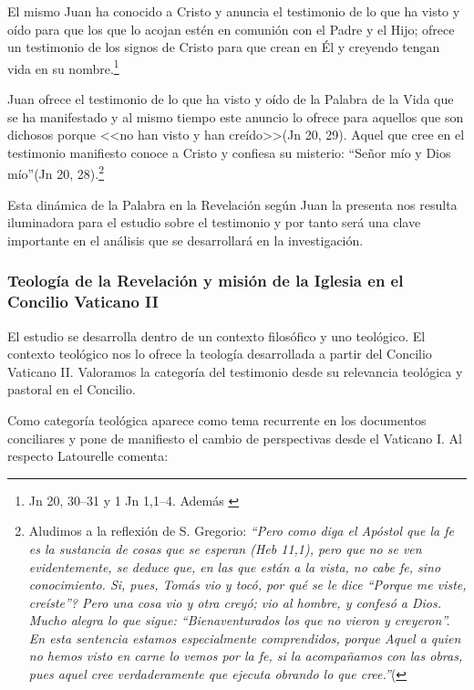 \documentclass[11pt]{article}
\begin{document}
El mismo Juan ha conocido a Cristo y anuncia el testimonio de lo que ha visto y oído para que los que lo acojan estén en comunión con el Padre y el Hijo; ofrece un testimonio de los signos de Cristo para que crean en Él y creyendo tengan vida en su nombre.\footnote{Jn 20, 30--31 y 1 Jn 1,1--4. Además \cite[1530]{dicctf}} 

Juan ofrece el testimonio de lo que ha visto y oído de la Palabra de la Vida que se ha manifestado y al mismo tiempo este anuncio lo ofrece para aquellos que son dichosos porque <<no han visto y han creído>>(Jn 20, 29). Aquel que cree en el testimonio manifiesto conoce a Cristo y confiesa su misterio: ``Señor mío y Dios mío''(Jn 20, 28).\footnote{Aludimos a la reflexión de S. Gregorio: \emph{``Pero como diga el Apóstol que la fe es la sustancia de cosas que se esperan (Heb 11,1), pero que no se ven evidentemente, se deduce que, en las que están a la vista, no cabe fe, sino conocimiento. Si, pues, Tomás vio y tocó, \textquestiondown{}por qué se le dice ``Porque me viste, creíste''? Pero una cosa vio y otra creyó; vio al hombre, y confesó a Dios. Mucho alegra lo que sigue: ``Bienaventurados los que no vieron y creyeron''. En esta sentencia estamos especialmente comprendidos, porque Aquel a quien no hemos visto en carne lo vemos por la fe, si la acompañamos con las obras, pues aquel cree verdaderamente que ejecuta obrando lo que cree.''}(\cite[Homilía 26]{greg}
}

Esta dinámica de la Palabra en la Revelación según Juan la presenta nos resulta iluminadora para el estudio sobre el testimonio y por tanto será una clave importante en el análisis que se desarrollará en la investigación.

\subsubsection{Teología de la Revelación y misión de la Iglesia en el Concilio Vaticano II}

El estudio se desarrolla dentro de un contexto filosófico y uno teológico. El contexto teológico nos lo ofrece la teología desarrollada a partir del Concilio Vaticano II. Valoramos la categoría del testimonio desde su relevancia teológica y pastoral en el Concilio. 

Como categoría teológica aparece como tema recurrente en los documentos conciliares y pone de manifiesto el cambio de perspectivas desde el Vaticano I. Al respecto Latourelle comenta:
\end{document}
